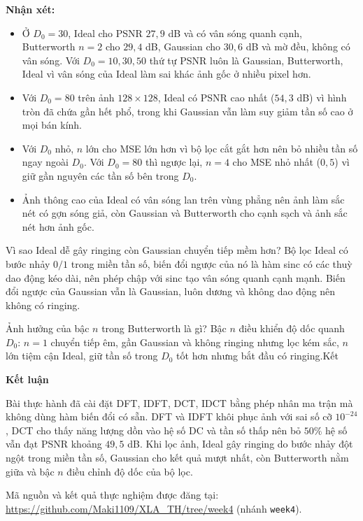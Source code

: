\documentclass[a4paper,12pt]{article}
\begin{document}
\textbf{Nhận xét:}
\begin{itemize}
    \item Ở $D_0=30$, Ideal cho PSNR $27{,}9$ dB và có vân sóng quanh cạnh, Butterworth $n=2$ cho $29{,}4$ dB, Gaussian cho $30{,}6$ dB và mờ đều, không có vân sóng. Với $D_0=10,30,50$ thứ tự PSNR luôn là Gaussian, Butterworth, Ideal vì vân sóng của Ideal làm sai khác ảnh gốc ở nhiều pixel hơn.
    \item Với $D_0=80$ trên ảnh $128\times 128$, Ideal có PSNR cao nhất ($54{,}3$ dB) vì hình tròn đã chứa gần hết phổ, trong khi Gaussian vẫn làm suy giảm tần số cao ở mọi bán kính.
    \item Với $D_0$ nhỏ, $n$ lớn cho MSE lớn hơn vì bộ lọc cắt gắt hơn nên bỏ nhiều tần số ngay ngoài $D_0$. Với $D_0=80$ thì ngược lại, $n=4$ cho MSE nhỏ nhất ($0{,}5$) vì giữ gần nguyên các tần số bên trong $D_0$.
    \item Ảnh thông cao của Ideal có vân sóng lan trên vùng phẳng nên ảnh làm sắc nét có gợn sóng giả, còn Gaussian và Butterworth cho cạnh sạch và ảnh sắc nét hơn ảnh gốc.
\end{itemize}

Vì sao Ideal dễ gây ringing còn Gaussian chuyển tiếp mềm hơn? Bộ lọc Ideal có bước nhảy $0/1$ trong miền tần số, biến đổi ngược của nó là hàm sinc có các thuỳ dao động kéo dài, nên phép chập với sinc tạo vân sóng quanh cạnh mạnh. Biến đổi ngược của Gaussian vẫn là Gaussian, luôn dương và không dao động nên không có ringing.

Ảnh hưởng của bậc $n$ trong Butterworth là gì? Bậc $n$ điều khiển độ dốc quanh $D_0$: $n=1$ chuyển tiếp êm, gần Gaussian và không ringing nhưng lọc kém sắc, $n$ lớn tiệm cận Ideal, giữ tần số trong $D_0$ tốt hơn nhưng bắt đầu có ringing.Kết

{\LARGE\bfseries Kết luận}\par\vspace{0.8em}
Bài thực hành đã cài đặt DFT, IDFT, DCT, IDCT bằng phép nhân ma trận mà không dùng hàm biến đổi có sẵn. DFT và IDFT khôi phục ảnh với sai số cỡ $10^{-24}$, DCT cho thấy năng lượng dồn vào hệ số DC và tần số thấp nên bỏ $50\%$ hệ số vẫn đạt PSNR khoảng $49{,}5$ dB. Khi lọc ảnh, Ideal gây ringing do bước nhảy đột ngột trong miền tần số, Gaussian cho kết quả mượt nhất, còn Butterworth nằm giữa và bậc $n$ điều chỉnh độ dốc của bộ lọc.

\vspace{1em}
Mã nguồn và kết quả thực nghiệm được đăng tại: \url{https://github.com/Maki1109/XLA_TH/tree/week4} (nhánh \texttt{week4}).
\end{document}
